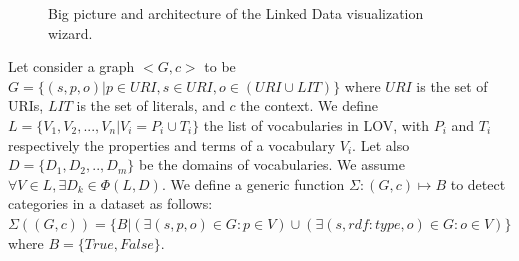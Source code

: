 \begin{figure}[!htbp]
\begin{center}


\caption{Big picture and architecture of the Linked Data visualization wizard.}
\label{fig:workflow}
\end{center}
\end{figure}

Let consider a graph $<G,c>$ to be $G=\{(s,p,o)| p \in URI, s \in URI, o \in (URI \cup LIT)\} $ where $URI$ is the set of URIs, $LIT$ is the set of literals, and $c$ the context. We define $L=\{V_{1}, V_{2}, ...,V_{n} | V_{i}=P_{i} \cup T_{i}\} $ the list of vocabularies in LOV, with $P_{i}$ and $T_{i}$ respectively the properties and terms of a vocabulary $V_{i}$. Let also $D=\{D_{1}, D_{2}, ..,D_{m} \} $ be the domains of vocabularies. We assume $ \forall V \in L, \exists D_{k} \in \Phi(L,D) $. We define a generic function $\Sigma:(G,c)\mapsto B $ to detect categories in a dataset as follows: $\Sigma((G,c))=\{B| ( \exists(s,p,o) \in G: p \in V) \cup (\exists(s, rdf:type,o) \in G: o \in V)\} $ where $B =\{True, False\} $.


